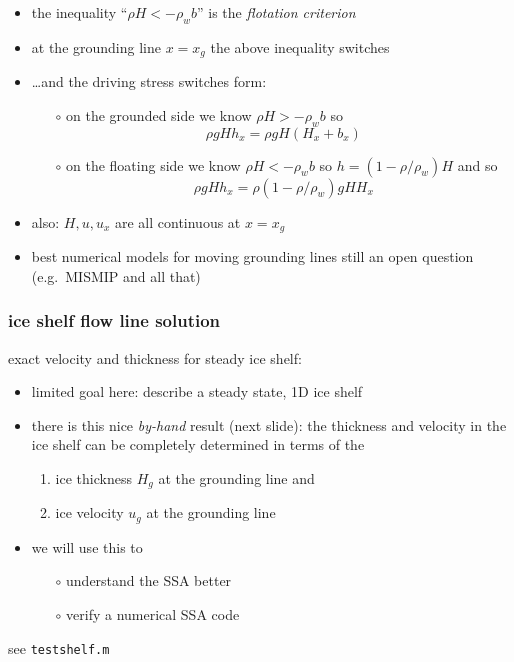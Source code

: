 \documentclass[titlepage,letterpaper,final,12pt]{scrartcl}
\newcommand{\alert}[1]{\emph{#1}}
\begin{document}
\begin{itemize}
\item the inequality ``$\rho H < - \rho_w b$'' is the \alert{flotation criterion}
\item at the grounding line $x=x_g$ the above inequality switches
\item \dots and the driving stress switches form:
  \begin{itemize}
  \item[$\circ$] on the grounded side we know $\rho H > - \rho_w b$ so
  	$$\rho g H h_x = \rho g H (H_x + b_x)$$
  \item[$\circ$] on the floating side we know $\rho H < - \rho_w b$ so $h = (1-\rho/\rho_w) H$ and so
  	$$\rho g H h_x = \rho(1-\rho/\rho_w) g H H_x$$
  \end{itemize}
\item also: $H,u,u_x$ are all continuous at $x=x_g$
\item best numerical models for moving grounding lines still an open question (e.g.~MISMIP and all that)
\end{itemize}


\subsubsection*{ice shelf flow line solution}

exact velocity and thickness for steady ice shelf:
\begin{itemize}
\item limited goal here: describe a steady state, 1D ice shelf
\item there is this nice \alert{by-hand} result (next slide): the thickness and velocity in the ice shelf can be completely determined \cite{MacAyealBarcilon,vanderVeen83} in terms of the 
  \begin{enumerate}
  \item ice thickness $H_g$ at the grounding line and
  \item ice velocity $u_g$ at the grounding line
  \end{enumerate}
\item we will use this to
  \begin{itemize}
  \item[$\circ$] understand the SSA better
  \item[$\circ$] verify a numerical SSA code
  \end{itemize}
\end{itemize}

see \texttt{testshelf.m} 
\end{document}
